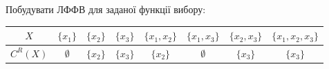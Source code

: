 \newpage

\begin{problem}
    Побудувати ЛФФВ для заданої функції вибору: 
    
    \begin{table}[H]
        \centering
        \begin{tabular}{|c|c|c|c|c|c|c|c|}
            \hline
            $X$ & $\{x_1\}$ & $\{x_2\}$ & $\{x_3\}$ & $\{x_1, x_2\}$ & $\{x_1, x_3\}$ & $\{x_2, x_3\}$ & $\{x_1, x_2, x_3\}$ \\ \hline
            $C^R(X)$ & $\emptyset$ & $\{x_2\}$ & $\{x_3\}$ & $\{x_2\}$ & $\emptyset$ & $\{x_3\}$ & $\{x_3\}$ \\ \hline
        \end{tabular}
    \end{table}
\end{problem}

